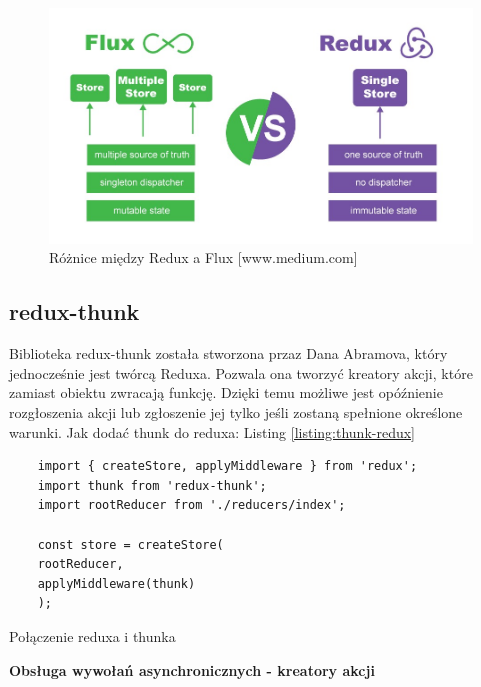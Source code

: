 \begin{figure}
	\centering\includegraphics[width=.6\textwidth]{img/reduxFlux}
	\caption{Różnice między Redux a Flux [www.medium.com]}\label{rys:reduxFlux}%
\end{figure}

\subsection{redux-thunk}

Biblioteka redux-thunk została stworzona przaz Dana Abramova, który jednocześnie jest twórcą Reduxa. Pozwala ona tworzyć kreatory akcji, które zamiast obiektu zwracają funkcję. Dzięki temu możliwe jest opóźnienie rozgłoszenia akcji lub zgłoszenie jej tylko jeśli zostaną spełnione określone warunki.\cite{www_thunk} Jak dodać thunk do reduxa: Listing \ref{listing:thunk-redux}

\begin{listing}
	\begin{verbatim}
	import { createStore, applyMiddleware } from 'redux';
	import thunk from 'redux-thunk';
	import rootReducer from './reducers/index';
	
	const store = createStore(
	rootReducer,
	applyMiddleware(thunk)
	);
	\end{verbatim}
	\caption{Połączenie reduxa i thunka} \label{listing:thunk-redux}
\end{listing}

\newpage

\begin{center}
	\textbf{Obsługa wywołań asynchronicznych - kreatory akcji}
\end{center}

